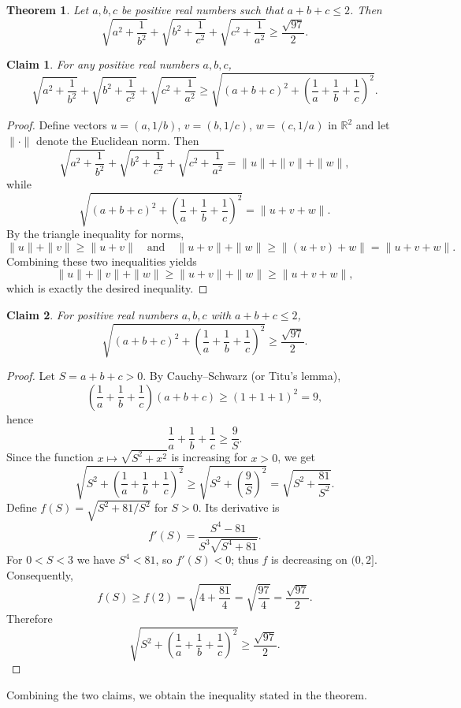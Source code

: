 \documentclass{article}
\newtheorem{theorem}{Theorem}
\newtheorem{claim}{Claim}
\begin{document}
\begin{theorem}
Let $a, b, c$ be positive real numbers such that $a + b + c \leq 2$. Then
\[
\sqrt{a^2 + \frac{1}{b^2}} + \sqrt{b^2 + \frac{1}{c^2}} + \sqrt{c^2 + \frac{1}{a^2}} \geq \frac{\sqrt{97}}{2}.
\]
\end{theorem}

\begin{claim}
For any positive real numbers $a, b, c$,
\[
\sqrt{a^2 + \frac{1}{b^2}} + \sqrt{b^2 + \frac{1}{c^2}} + \sqrt{c^2 + \frac{1}{a^2}} \geq \sqrt{(a+b+c)^2 + \left(\frac{1}{a} + \frac{1}{b} + \frac{1}{c}\right)^2}.
\]
\end{claim}

\begin{proof}
Define vectors $u = (a, 1/b)$, $v = (b, 1/c)$, $w = (c, 1/a)$ in $\mathbb{R}^2$ and let $\|\cdot\|$ denote the Euclidean norm. Then
\[
\sqrt{a^2 + \frac{1}{b^2}} + \sqrt{b^2 + \frac{1}{c^2}} + \sqrt{c^2 + \frac{1}{a^2}} = \|u\| + \|v\| + \|w\|,
\]
while
\[
\sqrt{(a+b+c)^2 + \left(\frac{1}{a} + \frac{1}{b} + \frac{1}{c}\right)^2} = \|u + v + w\|.
\]
By the triangle inequality for norms,
\[
\|u\| + \|v\| \geq \|u + v\| \quad \text{and} \quad \|u + v\| + \|w\| \geq \|(u + v) + w\| = \|u + v + w\|.
\]
Combining these two inequalities yields
\[
\|u\| + \|v\| + \|w\| \geq \|u + v\| + \|w\| \geq \|u + v + w\|,
\]
which is exactly the desired inequality.
\end{proof}

\begin{claim}
For positive real numbers $a, b, c$ with $a + b + c \leq 2$,
\[
\sqrt{(a+b+c)^2 + \left(\frac{1}{a} + \frac{1}{b} + \frac{1}{c}\right)^2} \geq \frac{\sqrt{97}}{2}.
\]
\end{claim}

\begin{proof}
Let $S = a + b + c > 0$. By Cauchy--Schwarz (or Titu's lemma),
\[
\left(\frac{1}{a} + \frac{1}{b} + \frac{1}{c}\right)(a + b + c) \geq (1 + 1 + 1)^2 = 9,
\]
hence
\[
\frac{1}{a} + \frac{1}{b} + \frac{1}{c} \geq \frac{9}{S}.
\]
Since the function $x \mapsto \sqrt{S^2 + x^2}$ is increasing for $x > 0$, we get
\[
\sqrt{S^2 + \left(\frac{1}{a} + \frac{1}{b} + \frac{1}{c}\right)^2} \geq \sqrt{S^2 + \left(\frac{9}{S}\right)^2} = \sqrt{S^2 + \frac{81}{S^2}}.
\]
Define $f(S) = \sqrt{S^2 + 81/S^2}$ for $S > 0$. Its derivative is
\[
f'(S) = \frac{S^4 - 81}{S^3 \sqrt{S^4 + 81}}.
\]
For $0 < S < 3$ we have $S^4 < 81$, so $f'(S) < 0$; thus $f$ is decreasing on $(0, 2]$. Consequently,
\[
f(S) \geq f(2) = \sqrt{4 + \frac{81}{4}} = \sqrt{\frac{97}{4}} = \frac{\sqrt{97}}{2}.
\]
Therefore
\[
\sqrt{S^2 + \left(\frac{1}{a} + \frac{1}{b} + \frac{1}{c}\right)^2} \geq \frac{\sqrt{97}}{2}.
\]
\end{proof}

Combining the two claims, we obtain the inequality stated in the theorem.
\end{document}
